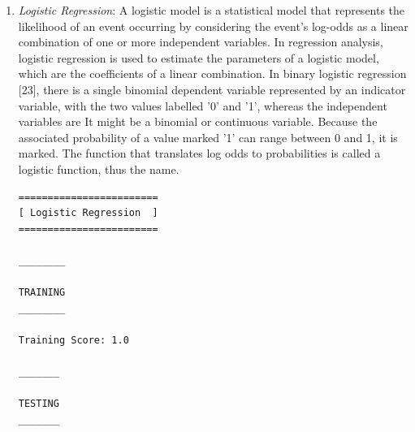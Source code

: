 \documentclass[conference]{IEEEtran}
\begin{document}
\begin{enumerate}
\item \textit{Logistic Regression}: A logistic model is a statistical model that represents the likelihood of an event occurring by considering the event's log-odds as a linear combination of one or more independent variables. In regression analysis, logistic regression is used to estimate the parameters of a logistic model, which are the coefficients of a linear combination. In binary logistic regression [23], there is a single binomial dependent variable represented by an indicator variable, with the two values labelled '0' and '1', whereas the independent variables are It might be a binomial or continuous variable. Because the associated probability of a value marked '1' can range between 0 and 1, it is marked. The function that translates log odds to probabilities is called a logistic function, thus the name.
\begin{verbatim}
========================
[ Logistic Regression  ]
========================

________

TRAINING
________

Training Score: 1.0

_______

TESTING
_______


\end{verbatim}
\end{enumerate}
\end{document}
